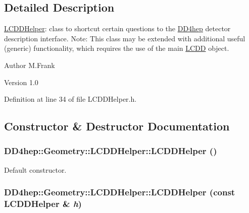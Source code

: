 \subsection{Detailed Description}
\hyperlink{class_d_d4hep_1_1_geometry_1_1_l_c_d_d_helper}{LCDDHelper}: class to shortcut certain questions to the \hyperlink{namespace_d_d4hep}{DD4hep} detector description interface. Note: This class may be extended with additional useful (generic) functionality, which requires the use of the main \hyperlink{class_d_d4hep_1_1_geometry_1_1_l_c_d_d}{LCDD} object.

\begin{DoxyAuthor}{Author}
M.Frank 
\end{DoxyAuthor}
\begin{DoxyVersion}{Version}
1.0 
\end{DoxyVersion}


Definition at line 34 of file LCDDHelper.h.

\subsection{Constructor \& Destructor Documentation}
\hypertarget{class_d_d4hep_1_1_geometry_1_1_l_c_d_d_helper_a4475a02b960e4d0572dcb186139066f2}{
\subsubsection[{LCDDHelper}]{\setlength{\rightskip}{0pt plus 5cm}DD4hep::Geometry::LCDDHelper::LCDDHelper ()}}
\label{class_d_d4hep_1_1_geometry_1_1_l_c_d_d_helper_a4475a02b960e4d0572dcb186139066f2}


Default constructor. \hypertarget{class_d_d4hep_1_1_geometry_1_1_l_c_d_d_helper_a0dea6c284dee2995a20ad50486c73a7d}{
\subsubsection[{LCDDHelper}]{\setlength{\rightskip}{0pt plus 5cm}DD4hep::Geometry::LCDDHelper::LCDDHelper (const {\bf LCDDHelper} \& {\em h})}}
\label{class_d_d4hep_1_1_geometry_1_1_l_c_d_d_helper_a0dea6c284dee2995a20ad50486c73a7d}


